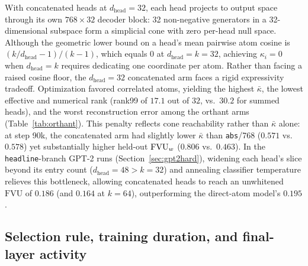 With concatenated heads at $d_{\mathrm{head}}{=}32$, each head projects to
output space through its own $768\times32$ decoder block: 32 non-negative
generators in a 32-dimensional subspace form a simplicial cone with zero
per-head null space. Although the geometric lower bound on a head's mean
pairwise atom cosine is $(k/d_{\mathrm{head}} - 1)/(k-1)$, which equals
$0$ at $d_{\mathrm{head}}{=}k{=}32$, achieving $\kappa_i{=}0$ when
$d_{\mathrm{head}}{=}k$ requires dedicating one coordinate per atom. Rather
than facing a raised cosine floor, the $d_{\mathrm{head}}{=}32$
concatenated arm faces a rigid expressivity tradeoff. Optimization favored
correlated atoms, yielding the highest $\bar\kappa$, the lowest effective
and numerical rank (rank99 of $17.1$ out of $32$, vs.\ $30.2$ for summed
heads), and the worst reconstruction error among the orthant arms
(Table~\ref{tab:orthant}). This penalty reflects cone reachability rather
than $\bar\kappa$ alone: at step 90k, the concatenated arm had slightly
lower $\bar\kappa$ than \texttt{abs}/768 ($0.571$ vs.\ $0.578$) yet
substantially higher held-out $\mathrm{FVU}_w$ ($0.806$ vs.\ $0.463$). In the
\texttt{headline}-branch GPT-2 runs (Section~\ref{sec:gpt2hard}), widening
each head's slice beyond its entry count ($d_{\mathrm{head}}{=}48 > k{=}32$)
and annealing classifier temperature relieves this bottleneck, allowing
concatenated heads to reach an unwhitened $\mathrm{FVU}$ of $0.186$ (and
$0.164$ at $k{=}64$), outperforming the direct-atom model's $0.195$.

\subsection{Selection rule, training duration, and final-layer activity}
\label{sec:lastlayer}

